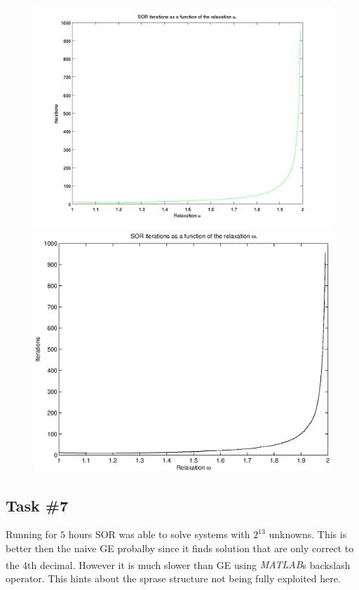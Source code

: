 \documentclass[10pt, a4paper]{article}
\newcommand{\matlab}{\small{\emph{MATLAB\textsuperscript{\textregistered}}}}
\begin{document}
\begin{figure}[hbt]
\begin{center}
\ifpdf
	\includegraphics[width=\linewidth]{../img/task6_plot.png}
\else
	\includegraphics[width=\linewidth]{../img/task6_plot.eps}
\fi
\end{center}
\label{fig+task6}
\caption{}
\end{figure}

\subsection{Task \#7}
Running for $5$ hours SOR was able to solve systems with $2^{13}$ unknowns. This is better then the naive GE probalby since it finds solution that are only correct to the 4th decimal. However it is much slower than GE using \matlab{}s backslash operator. This hints about the sprase structure not being fully exploited here.
\end{document}
